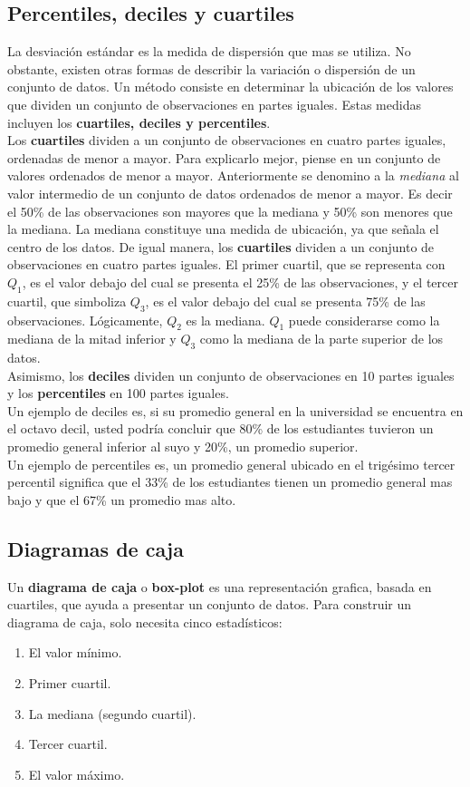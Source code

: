 \documentclass[]{article}
\begin{document}
\subsection{Percentiles, deciles y cuartiles}
La desviación estándar es la medida de dispersión que mas se utiliza. No obstante, existen otras formas de describir la variación o dispersión de un conjunto de datos. Un método consiste en determinar la ubicación de los valores que dividen un conjunto de observaciones en partes iguales. Estas medidas incluyen los \textbf{cuartiles, deciles y percentiles}.\\
Los \textbf{cuartiles} dividen a un conjunto de observaciones en cuatro partes iguales, ordenadas de menor a mayor. Para explicarlo mejor, piense en un conjunto de valores ordenados de menor a mayor. Anteriormente se denomino a la \textit{mediana} al valor intermedio de un conjunto de datos ordenados de menor a mayor. Es decir el 50\% de las observaciones son mayores que la mediana y 50\% son menores que la mediana. La mediana constituye una medida de ubicación, ya que señala el centro de los datos. De igual manera, los \textbf{cuartiles} dividen a un conjunto de observaciones en cuatro partes iguales. El primer cuartil, que se representa con $Q_{1}$, es el valor debajo del cual se presenta el 25\% de las observaciones, y el tercer cuartil, que simboliza $Q_{3}$, es el valor debajo del cual se presenta 75\% de las observaciones. Lógicamente, $Q_{2}$ es la mediana. $Q_{1}$ puede considerarse  como la mediana de la mitad inferior y $Q_{3}$ como la mediana de la parte superior de los datos. \\
Asimismo, los \textbf{deciles} dividen un conjunto de observaciones en 10 partes iguales y los \textbf{percentiles} en 100 partes iguales.\\Un ejemplo de deciles es, si su promedio general en la universidad se encuentra en el octavo decil, usted podría concluir que 80\% de los estudiantes tuvieron un promedio general inferior al suyo y 20\%, un promedio superior. \\ Un ejemplo de percentiles es, un promedio general ubicado en el trigésimo tercer percentil significa que el 33\% de los estudiantes tienen un promedio general mas bajo y que el 67\% un promedio mas alto.
\subsection{Diagramas de caja}
Un \textbf{diagrama de caja} o \textbf{box-plot} es una representación grafica, basada en cuartiles, que ayuda a presentar un conjunto de datos. Para construir un diagrama de caja, solo necesita cinco estadísticos:
\begin{enumerate}
	\item El valor mínimo.
	\item Primer cuartil.
	\item La mediana (segundo cuartil).
	\item Tercer cuartil.
	\item El valor máximo.
\end{enumerate}
\end{document}
